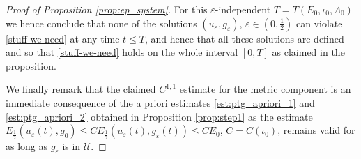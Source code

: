 \documentclass[10pt,reqno]{amsart}
\theoremstyle{plain}
\theoremstyle{definition}
\numberwithin{equation}{section}
\newcommand{\La}{\Lambda}
\newcommand{\half}{\frac{1}{2}}
\newcommand{\eps}{\varepsilon}
\newcommand{\UU}{{\mathcal U}}
\begin{document}
\begin{proof}[Proof of Proposition \ref{prop:ep_system}]
    For this $\eps$-independent $T=T(E_0,\iota_0,\La_0)$ we hence conclude that none of the solutions $(u_\eps,g_\eps)$, $\eps\in (0,\half)$ can violate \eqref{stuff-we-need} at any time $t\leq T$, and hence that all these solutions are defined and so that \eqref{stuff-we-need} holds on the whole interval $[0,T]$ as claimed in the proposition. 

    We finally remark that the claimed $C^{1,1}$ estimate for the metric component is an immediate consequence of the a priori estimates \eqref{est:ptg_apriori_1} and \eqref{est:ptg_apriori_2} obtained in Proposition \ref{prop:step1} as the estimate $E_{\half}(u_\eps(t),g_0)\leq CE_{\half}(u_\eps(t),g_\eps(t))\leq C E_0$, $C=C(\iota_0)$, remains valid for as long as $g_\eps$ is in $\UU$. 
\end{proof}
\end{document}
